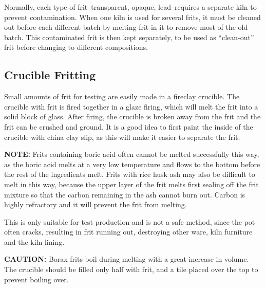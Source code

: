 Normally, each type of frit--transparent, opaque, lead--requires a separate 
kiln to prevent contamination. When one kiln is used for several frits, it must 
be cleaned out before each different batch by melting frit in it to remove most 
of the old batch. This contaminated frit is then kept separately, to be used as 
``clean-out'' frit before changing to different compositions.
\subsection{Crucible Fritting}
Small amounts of frit for testing are easily made in a fireclay crucible. The 
crucible with frit is fired together in a glaze firing, which will melt the 
frit into a solid block of glass. After firing, the crucible is broken away 
from the frit and the frit can be crushed and ground. It is a good idea to 
first paint the inside of the crucible with china clay slip, as this will make 
it easier to separate the frit. 

\textbf{NOTE:} Frits containing boric acid often cannot be melted successfully 
this way, as the boric acid melts at a very low temperature and flows to the 
bottom before the rest of the ingredients melt. Frits with rice husk ash may 
also be difficult to melt in this way, because the upper layer of the frit 
melts first sealing off the frit mixture so that the carbon remaining in the 
ash cannot burn out. Carbon is highly refractory and it will prevent the frit 
from melting.

This is only suitable for test production and is not a safe method, since the 
pot often cracks, resulting in frit running out, destroying other ware, kiln 
furniture and the kiln lining.

\textbf{CAUTION:} Borax frits boil during melting with a great increase in 
volume. The crucible should be filled only half with frit, and a tile placed 
over the top to prevent boiling over.
